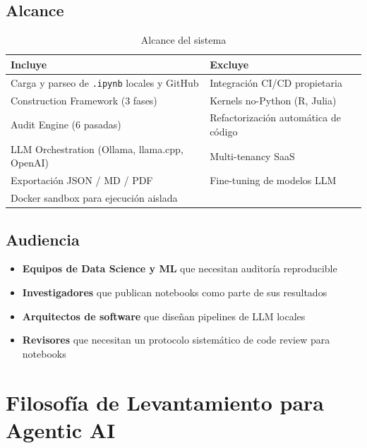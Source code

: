 \documentclass[12pt,a4paper]{article}
\begin{document}
\subsection{Alcance}
\label{sec:alcance}

\begin{table}[h]
\centering
\begin{tabular}{p{} p{}}
\toprule
\textbf{Incluye} & \textbf{Excluye} \\
\midrule
Carga y parseo de \texttt{.ipynb} locales y GitHub         & Integración CI/CD propietaria \\
Construction Framework (3 fases)                            & Kernels no-Python (R, Julia)  \\
Audit Engine (6 pasadas)                                    & Refactorización automática de código \\
LLM Orchestration (Ollama, llama.cpp, OpenAI)               & Multi-tenancy SaaS \\
Exportación JSON / MD / PDF                                 & Fine-tuning de modelos LLM \\
Docker sandbox para ejecución aislada                       & \\
\bottomrule
\end{tabular}
\caption{Alcance del sistema}
\end{table}

\subsection{Audiencia}
\label{sec:audiencia}

\begin{itemize}
  \item \textbf{Equipos de Data Science y ML} que necesitan auditoría reproducible
  \item \textbf{Investigadores} que publican notebooks como parte de sus resultados
  \item \textbf{Arquitectos de software} que diseñan pipelines de LLM locales
  \item \textbf{Revisores} que necesitan un protocolo sistemático de code review para notebooks
\end{itemize}

\section{Filosofía de Levantamiento para Agentic AI}
\end{document}
